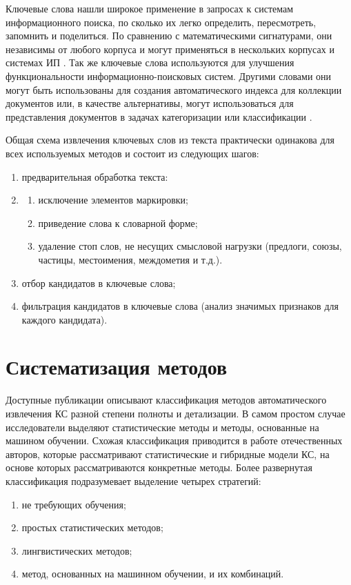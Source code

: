 Ключевые слова нашли широкое применение в запросах к системам информационного поиска, по сколько их легко определить, пересмотреть, запомнить и поделиться.
По сравнению с математическими сигнатурами, они независимы от любого корпуса и могут применяться в нескольких корпусах и системах ИП \cite{5}.
Так же ключевые слова используются для улучшения функциональности информационно-поисковых систем.
Другими словами они могут быть использованы для создания автоматического индекса для коллекции документов или, в качестве альтернативы, могут использоваться для представления документов в задачах категоризации или классификации \cite{1}.

Общая схема извлечения ключевых слов из текста практически одинакова для всех используемых методов и состоит из следующих шагов:
\begin{enumerate}
	\item предварительная обработка текста:
	\item \begin{enumerate}
		\item исключение элементов маркировки;
		\item приведение слова к словарной форме;
		\item удаление стоп слов, не несущих смысловой нагрузки (предлоги, союзы, частицы, местоимения, междометия и т.д.).
	\end{enumerate}
	\item отбор кандидатов в ключевые слова;
	\item фильтрация кандидатов в ключевые слова (анализ значимых признаков для каждого кандидата).
\end{enumerate}

\section{Систематизация методов}
Доступные публикации описывают классификация методов автоматического извлечения КС разной степени полноты и детализации. 
В самом простом случае исследователи выделяют статистические методы и методы, основанные на машином обучении.
Схожая классификация приводится в работе отечественных авторов, которые рассматривают статистические и гибридные модели КС, на основе которых рассматриваются конкретные методы. 
Более развернутая классификация подразумевает выделение четырех стратегий:
\begin{enumerate}
	\item не требующих обучения; 
	\item простых статистических методов;
	\item лингвистических методов;
	\item метод, основанных на машинном обучении, и их комбинаций.
\end{enumerate}

